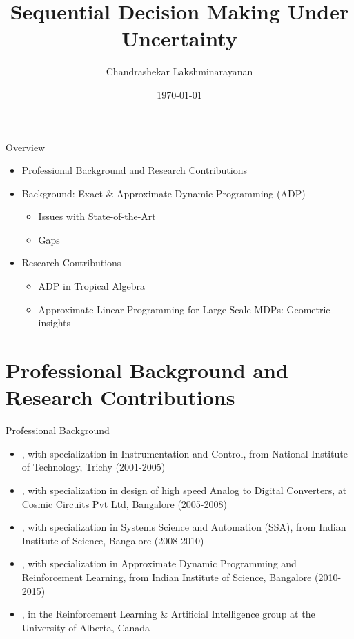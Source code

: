 \documentclass[10pt]{beamer}
\title{Sequential Decision Making Under Uncertainty}
\date{\today}
\author{Chandrashekar Lakshminarayanan}
\institute{Reinforcement Learning \& Artificial Intelligence Group,\\University of Alberta}
\begin{document}
\maketitle

\begin{frame}{Overview}
\begin{itemize}
\item {Professional Background and Research Contributions}
\item {Background: Exact \& Approximate Dynamic Programming (ADP) }
\begin{itemize}
\item Issues with State-of-the-Art
\item Gaps
\end{itemize}
\item {Research Contributions}
\begin{itemize}
\item ADP in Tropical Algebra
\item Approximate Linear Programming for Large Scale MDPs: Geometric insights
\end{itemize}
\end{itemize}

\end{frame}



\section{Professional Background and Research Contributions}

\begin{frame}[fragile]{Professional Background}
\begin{itemize}
\item {\color{orange}{Bachelor of Technology}}, with specialization in Instrumentation and Control, from National Institute of Technology, Trichy (2001-2005)
\item {\color{orange}{Analog Design Engineer}}, with specialization in design of high speed Analog to Digital Converters, at Cosmic Circuits Pvt Ltd, Bangalore (2005-2008)
\item {\color{orange}{Master of Engineering}}, with specialization in Systems Science and Automation (SSA), from Indian Institute of Science, Bangalore (2008-2010)
\item {\color{orange}{PhD}}, with specialization in Approximate Dynamic Programming and Reinforcement Learning, from Indian Institute of Science, Bangalore (2010-2015)
\item {\color{orange}{Post Doctoral Fellow }}, in the Reinforcement Learning \& Artificial Intelligence group at the University of Alberta, Canada
\end{itemize}
\end{frame}
\end{document}
